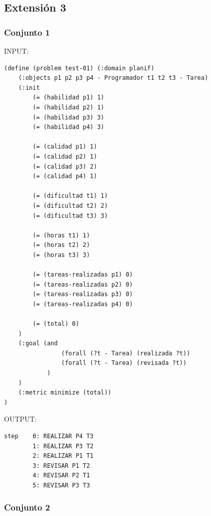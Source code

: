 \documentclass[12pt, titlepage]{article}
\begin{document}
\subsection{Extensión 3}

\subsubsection*{Conjunto 1}
INPUT:
\begin{lstlisting}[language=PDDL]
(define (problem test-01) (:domain planif)
    (:objects p1 p2 p3 p4 - Programador t1 t2 t3 - Tarea)
    (:init
        (= (habilidad p1) 1)
        (= (habilidad p2) 1)
        (= (habilidad p3) 3)
        (= (habilidad p4) 3)
        
        (= (calidad p1) 1)
        (= (calidad p2) 1)
        (= (calidad p3) 2)
        (= (calidad p4) 1)
        
        (= (dificultad t1) 1)
        (= (dificultad t2) 2)
        (= (dificultad t3) 3)
        
        (= (horas t1) 1)
        (= (horas t2) 2)
        (= (horas t3) 3)

        (= (tareas-realizadas p1) 0)
        (= (tareas-realizadas p2) 0)
        (= (tareas-realizadas p3) 0)
        (= (tareas-realizadas p4) 0)
        
        (= (total) 0)
    )
    (:goal (and
                (forall (?t - Tarea) (realizada ?t))
                (forall (?t - Tarea) (revisada ?t))
            )
    )
    (:metric minimize (total))
)
\end{lstlisting}

OUTPUT:
\begin{lstlisting}
step    0: REALIZAR P4 T3
        1: REALIZAR P3 T2
        2: REALIZAR P1 T1
        3: REVISAR P1 T2
        4: REVISAR P2 T1
        5: REVISAR P3 T3
\end{lstlisting}

\subsubsection*{Conjunto 2}
\end{document}
